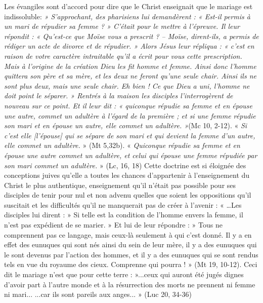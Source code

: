  Les évangiles sont d'accord pour dire que le Christ enseignait que le mariage est indissoluble: \emph{ » S'approchant, des pharisiens lui demandèrent : « Est-il permis à un mari de répudier sa femme ? » C'était pour le mettre à l'épreuve. Il leur répondit : « Qu'est-ce que Moïse vous a prescrit ? – Moïse, dirent-ils, a permis de rédiger un acte de divorce et de répudier. » Alors Jésus leur répliqua : « c'est en raison de votre caractère intraitable qu'il a écrit pour vous cette prescription. Mais à l'origine de la création Dieu les fit homme et femme. Ainsi donc l'homme quittera son père et sa mère, et les deux ne feront qu'une seule chair. Ainsi ils ne sont plus deux, mais une seule chair. Eh bien ! Ce que Dieu a uni, l'homme ne doit point le séparer. » Rentrés à la maison les disciples l'interrogèrent de nouveau sur ce point. Et il leur dit : « quiconque répudie sa femme et en épouse une autre, commet un adultère à l'égard de la première ; et si une femme répudie son mari et en épouse un autre, elle commet un adultère. »}(Mc 10, 2-12). « \emph{Si c'est elle [l'épouse] qui se sépare de son mari et qui devient la femme d'un autre, elle commet un adultère.} » (Mt 5,32b). « \emph{Quiconque répudie sa femme et en épouse une autre commet un adultère, et celui qui épouse une femme répudiée par son mari commet un adultère.} » (Lc, 16, 18) 
 Cette doctrine est si éloignée des conceptions juives qu'elle a toutes les chances d'appartenir à l'enseignement du Christ le plus authentique, enseignement qu'il n'était pas possible pour ses disciples de tenir pour nul et non advenu quelles que soient les oppositions qu'il suscitait et les difficultés qu'il ne manquerait pas de créer à l'avenir : « …Les disciples lui dirent : » Si telle est la condition de l'homme envers la femme, il n'est pas expédient de se marier. » Et lui de leur répondre : » Tous ne comprennent pas ce langage, mais ceux-là seulement à qui c'est donné. Il y a en effet des eunuques qui sont nés ainsi du sein de leur mère, il y a des eunuques qui le sont devenus par l'action des hommes, et il y a des eunuques qui se sont rendus tels en vue du royaume des cieux. Comprenne qui pourra ! » (Mt 19, 10-12). 
 Ceci dit le mariage n'est que pour cette terre : »...ceux qui auront été jugés dignes d'avoir part à l'autre monde et à la résurrection des morts ne prennent ni femme ni mari... ...car ils sont pareils aux anges... » (Luc 20, 34-36)
